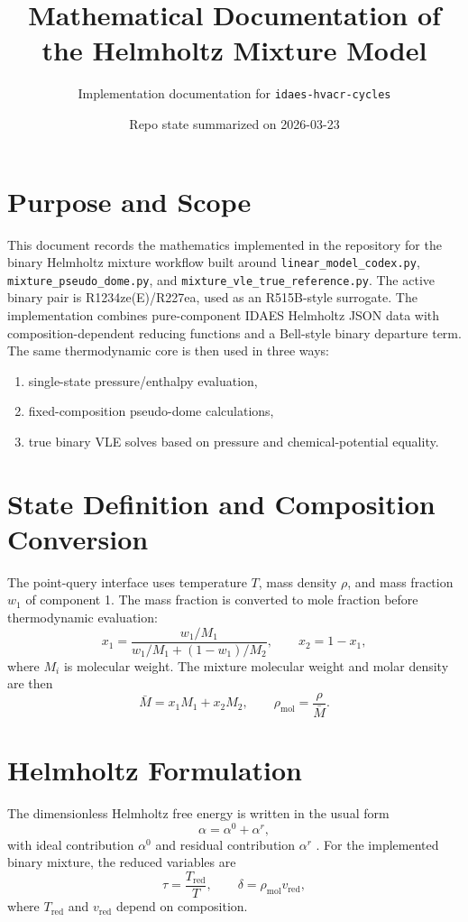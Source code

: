 \documentclass[11pt]{article}
\title{Mathematical Documentation of the Helmholtz Mixture Model}
\author{Implementation documentation for \texttt{idaes-hvacr-cycles}}
\date{Repo state summarized on 2026-03-23}
\begin{document}
\maketitle

\section{Purpose and Scope}
This document records the mathematics implemented in the repository for the binary Helmholtz mixture workflow built around \texttt{linear\_model\_codex.py}, \texttt{mixture\_pseudo\_dome.py}, and \texttt{mixture\_vle\_true\_reference.py}. The active binary pair is R1234ze(E)/R227ea, used as an R515B-style surrogate. The implementation combines pure-component IDAES Helmholtz JSON data with composition-dependent reducing functions and a Bell-style binary departure term. The same thermodynamic core is then used in three ways:
\begin{enumerate}
\item single-state pressure/enthalpy evaluation,
\item fixed-composition pseudo-dome calculations,
\item true binary VLE solves based on pressure and chemical-potential equality.
\end{enumerate}

\section{State Definition and Composition Conversion}
The point-query interface uses temperature $T$, mass density $\rho$, and mass fraction $w_1$ of component 1. The mass fraction is converted to mole fraction before thermodynamic evaluation:
\begin{equation}
x_1 = \frac{w_1/M_1}{w_1/M_1 + (1-w_1)/M_2},
\qquad
x_2 = 1-x_1,
\end{equation}
where $M_i$ is molecular weight. The mixture molecular weight and molar density are then
\begin{equation}
\bar{M} = x_1 M_1 + x_2 M_2,
\qquad
\rho_{\mathrm{mol}} = \frac{\rho}{\bar{M}}.
\end{equation}

\section{Helmholtz Formulation}
The dimensionless Helmholtz free energy is written in the usual form
\begin{equation}
\alpha = \alpha^0 + \alpha^r,
\end{equation}
with ideal contribution $\alpha^0$ and residual contribution $\alpha^r$ \cite{idaes_helmholtz,lemmon2004}. For the implemented binary mixture, the reduced variables are
\begin{equation}
\tau = \frac{T_{\mathrm{red}}}{T},
\qquad
\delta = \rho_{\mathrm{mol}} v_{\mathrm{red}},
\end{equation}
where $T_{\mathrm{red}}$ and $v_{\mathrm{red}}$ depend on composition.
\end{document}
